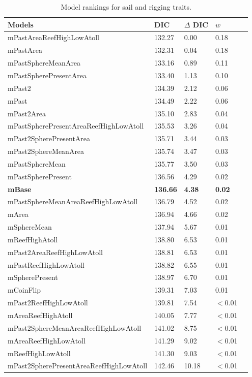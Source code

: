 
\begin{table}
\begin{center}
\begin{tabular}{lllll}
Models & DIC & $\Delta$ DIC & $w$\\
\hline
mPastAreaReefHighLowAtoll & 132.27 & 0.00 & 0.18\\
mPastArea & 132.31 & 0.04 & 0.18\\
mPastSphereMeanArea & 133.16 & 0.89 & 0.11\\
mPastSpherePresentArea & 133.40 & 1.13 & 0.10\\
mPast2 & 134.39 & 2.12 & 0.06\\
mPast & 134.49 & 2.22 & 0.06\\
mPast2Area & 135.10 & 2.83 & 0.04\\
mPastSpherePresentAreaReefHighLowAtoll & 135.53 & 3.26 & 0.04\\
mPast2SpherePresentArea & 135.71 & 3.44 & 0.03\\
mPast2SphereMeanArea & 135.74 & 3.47 & 0.03\\
mPastSphereMean & 135.77 & 3.50 & 0.03\\
mPastSpherePresent & 136.56 & 4.29 & 0.02\\
\textbf{mBase} & \textbf{136.66} & \textbf{4.38} & \textbf{0.02}\\
mPastSphereMeanAreaReefHighLowAtoll & 136.79 & 4.52 & 0.02\\
mArea & 136.94 & 4.66 & 0.02\\
mSphereMean & 137.94 & 5.67 & 0.01\\
mReefHighAtoll & 138.80 & 6.53 & 0.01\\
mPast2AreaReefHighLowAtoll & 138.81 & 6.53 & 0.01\\
mPastReefHighLowAtoll & 138.82 & 6.55 & 0.01\\
mSpherePresent & 138.97 & 6.70 & 0.01\\
mCoinFlip & 139.31 & 7.03 & 0.01\\
mPast2ReefHighLowAtoll & 139.81 & 7.54 & $<$0.01\\
mAreaReefHighAtoll & 140.05 & 7.77 & $<$0.01\\
mPast2SphereMeanAreaReefHighLowAtoll & 141.02 & 8.75 & $<$0.01\\
mAreaReefHighLowAtoll & 141.29 & 9.02 & $<$0.01\\
mReefHighLowAtoll & 141.30 & 9.03 & $<$0.01\\
mPast2SpherePresentAreaReefHighLowAtoll & 142.46 & 10.18 & $<$0.01\\
\end{tabular}
\end{center}
\caption{Model rankings for sail and rigging traits.
\label{resultstable7}}
\end{table}




























